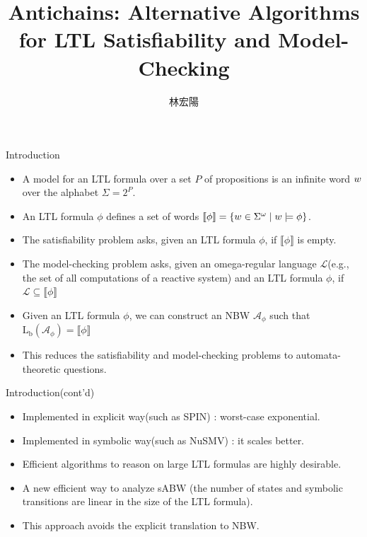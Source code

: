 \documentclass[12pt]{beamer}
\title{Antichains: Alternative Algorithms for LTL Satisfiability and Model-Checking}
\author{林宏陽}
\begin{document}
\begin{frame}
	\maketitle
\end{frame}

\begin{frame}{Introduction}
	\begin{itemize}
		\item A model for an LTL formula over a set $P$ of propositions is an infinite word $\mathnormal{w}$ over the alphabet $\Sigma = 2^{P}$.
		\item An LTL formula $\phi$ defines a set of words $\llbracket \phi \rrbracket = \{\mathnormal{w} \in \Sigma^{\omega} \mid \mathnormal{w} \models \phi\}$.
		\item The satisfiability problem asks, given an LTL formula $\phi$, if $\llbracket \phi \rrbracket$ is empty.
		\item The model-checking problem asks, given an omega-regular language $\mathcal{L}$(e.g., the set
of all computations of a reactive system) and an LTL formula $\phi$, if $\mathcal{L} \subseteq \llbracket \phi \rrbracket$
		\item Given an LTL formula $\phi$, we can construct an NBW $\mathcal{A}_{\phi}$ such that $\text{L}_{\text{b}}(\mathcal{A}_{\phi}) = \llbracket \phi \rrbracket$
		\item This reduces the satisfiability and model-checking problems to automata-theoretic questions.
	\end{itemize}
\end{frame}

\begin{frame}{Introduction(cont'd)}
	\begin{itemize}
		\item Implemented in explicit way(such as SPIN) : worst-case exponential.
		\item Implemented in symbolic way(such as NuSMV) : it scales better.
		\item Efficient algorithms to reason on large LTL formulas are highly desirable.
		\item A new efficient way to analyze sABW (the number of states and symbolic transitions are linear in the size of the LTL formula).
		\item This approach avoids the explicit translation to NBW.
	\end{itemize}
\end{frame}
\end{document}
